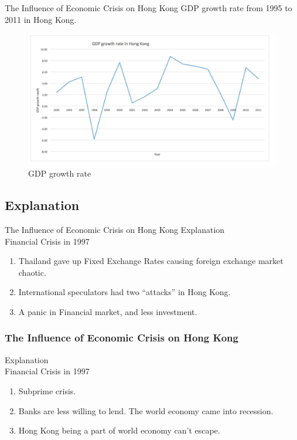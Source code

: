 \documentclass[slidestop,uncompress,mathsans, 12pt]{beamer}
\begin{document}
\begin{frame}{The Influence of Economic Crisis on Hong Kong }
GDP growth rate from 1995 to 2011 in Hong Kong.\\
\bigskip
\begin{figure}[h]
\raggedleft
\includegraphics[width=1\textwidth]{hk3.jpg}
\caption{GDP growth rate}
\label{threadsVsSync}
\end{figure}
\end{frame}

\subsection{Explanation}
\begin{frame}{The Influence of Economic Crisis on Hong Kong }
Explanation\\
\bigskip
\alert{Financial Crisis in 1997}
\bigskip

\begin{enumerate}[i]
\pause\item Thailand gave up Fixed Exchange Rates causing foreign exchange market chaotic.
\bigskip
\pause\item International speculators had two “attacks” in Hong Kong.
\bigskip
\pause\item A panic  in Financial market, and less investment.
\end{enumerate}

\end{frame}

\begin{frame}
\frametitle{The Influence of Economic Crisis on Hong Kong }
Explanation\\
\bigskip
\alert{Financial Crisis in 1997}
\bigskip
\begin{enumerate}[I]
\item <+-| alert@+> Subprime crisis. 
\bigskip
\item <+-| alert@+> Banks are less willing to lend. The world economy came into recession.
\bigskip
\item <+-| alert@+> Hong Kong being a part of world economy can't escape. 

\bigskip

\end{enumerate}
\end{frame}
\end{document}
